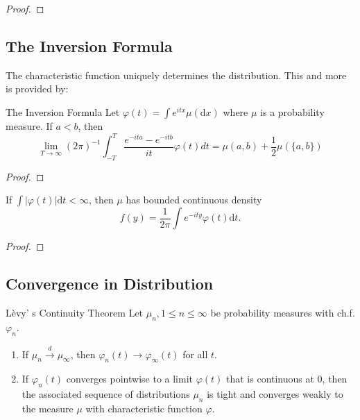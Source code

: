 \begin{proof}
    
\end{proof}

\subsection{The Inversion Formula}

The characteristic function uniquely determines the distribution. This and more is provided by:
\begin{theorem}{The Inversion Formula}{}
    Let $\varphi(t)=\int e^{itx}\mu(\mathrm{d}x)$ where $\mu$ is a probability measure. If $a<b$, then
    \begin{equation}
        \lim _{T \rightarrow \infty}(2 \pi)^{-1} \int_{-T}^{T} \frac{e^{-i t a}-e^{-i t b}}{i t} \varphi(t) d t=\mu(a, b)+\frac{1}{2} \mu(\{a, b\})
    \end{equation}
\end{theorem}

\begin{proof}
    
\end{proof}

\begin{theorem}{}{}
    If $\int|\varphi(t)|\mathrm{d}t<\infty$, then $\mu$ has bounded continuous density
    \begin{equation}
        f(y)=\frac{1}{2\pi}\int e^{-ity}\varphi(t) \mathrm{d}t.
    \end{equation}
\end{theorem}

\begin{proof}
    
\end{proof}

\subsection{Convergence in Distribution}

\begin{theorem}{L\`evy' s Continuity Theorem}{}
    Let $\mu_{n},1\leq n\leq\infty$ be probability measures with ch.f. $\varphi_{n}$.
    \begin{enumerate}
        \item If $\mu_{n}\stackrel{d}{\rightarrow}\mu_{\infty}$, then $\varphi_{n}(t)\rightarrow\varphi_{\infty}(t)$ for all $t$.
        \item If $\varphi_{n}(t)$ converges pointwise to a limit $\varphi(t)$ that is continuous at $0$, then the associated sequence of distributions $\mu_{n}$ is tight and converges weakly to the measure $\mu$ with characteristic function $\varphi$.
    \end{enumerate}
\end{theorem}

